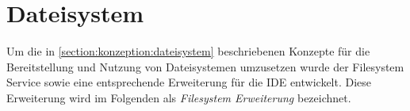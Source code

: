 \section{Dateisystem}\label{section:prototypische-implementierung:dateisystem}


Um die in \autoref{section:konzeption:dateisystem} beschriebenen Konzepte für die Bereitstellung und Nutzung von Dateisystemen umzusetzen wurde der Filesystem Service sowie eine entsprechende Erweiterung für die IDE entwickelt. Diese Erweiterung wird im Folgenden als \textit{Filesystem Erweiterung} bezeichnet.

